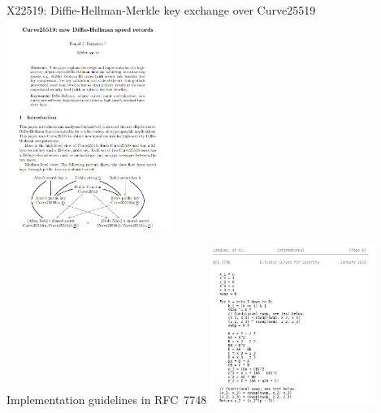 \documentclass[8pt,aspectratio=169]{beamer}
\begin{document}
\begin{frame}{X22519: Diffie-Hellman-Merkle key exchange over Curve25519}
	\centering
	\includegraphics[width=0.4\textwidth]{curvePaper.png}
\end{frame}


\begin{frame}{Implementation guidelines in RFC~7748}
	\centering
	\includegraphics[width=0.4\textwidth]{rfc.png}
\end{frame}
\end{document}
